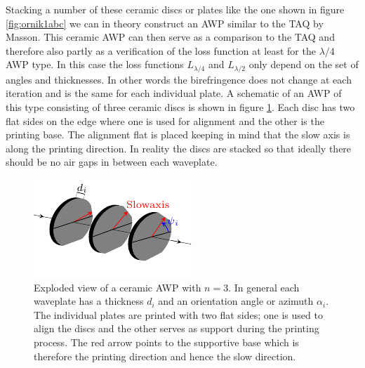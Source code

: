 Stacking a number of these ceramic discs or plates like the one shown in figure \ref{fig:ornik1abc} we can in theory construct an AWP similar to the TAQ by Masson. This ceramic AWP can then serve as a comparison to the TAQ and therefore also partly as a verification of the loss function at least for the $\lambda/4$ AWP type. In this case the loss functions $L_{\lambda/4}$ and $L_{\lambda/2}$ only depend on the set of angles and thicknesses. In other words the birefringence does not change at each iteration and is the same for each individual plate. A schematic of an AWP of this type consisting of three ceramic discs is shown in figure \ref{fig:ceramic_stack}. Each disc has two flat sides on the edge where one is used for alignment and the other is the printing base. The alignment flat is placed keeping in mind that the slow axis is along the printing direction. In reality the discs are stacked so that ideally there should be no air gaps in between each waveplate.

\begin{figure}[ht]
    \centering
    \includegraphics[scale=3.00]{images/results/tikz_wpstack_ceramic.pdf}
    \caption{Exploded view of a ceramic AWP with $n=3$. In general each waveplate has a thickness $d_i$ and an orientation angle or azimuth $\alpha_i$. The individual plates are printed with two flat sides; one is used to align the discs and the other serves as support during the printing process. The red arrow points to the supportive base which is therefore the printing direction and hence the slow direction.}
    \label{fig:ceramic_stack}
\end{figure}


